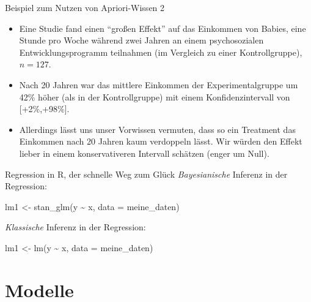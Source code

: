 \documentclass[
  ngerman,
  ignorenonframetext,
]{beamer}
\newenvironment{Shaded}{\begin{snugshade}}{\end{snugshade}}
\newcommand{\AttributeTok}[1]{\textcolor[rgb]{0.77,0.63,0.00}{#1}}
\newcommand{\FunctionTok}[1]{\textcolor[rgb]{0.00,0.00,0.00}{#1}}
\newcommand{\NormalTok}[1]{#1}
\newcommand{\OtherTok}[1]{\textcolor[rgb]{0.56,0.35,0.01}{#1}}
\newcommand{\SpecialCharTok}[1]{\textcolor[rgb]{0.00,0.00,0.00}{#1}}
\begin{document}
\begin{frame}{Beispiel zum Nutzen von Apriori-Wissen 2}
\protect\hypertarget{beispiel-zum-nutzen-von-apriori-wissen-2}{}
\begin{itemize}
\item
  Eine Studie fand einen ``großen Effekt'' auf das Einkommen von Babies,
  eine Stunde pro Woche während zwei Jahren an einem psychosozialen
  Entwicklungsprogramm teilnahmen (im Vergleich zu einer
  Kontrollgruppe), \(n=127\).
\item
  Nach 20 Jahren war das mittlere Einkommen der Experimentalgruppe um
  42\% höher (als in der Kontrollgruppe) mit einem Konfidenzintervall
  von {[}+2\%,+98\%{]}.
\item
  Allerdings lässt uns unser Vorwissen vermuten, dass so ein Treatment
  das Einkommen nach 20 Jahren kaum verdoppeln lässt. Wir würden den
  Effekt lieber in einem konservativeren Intervall schätzen (enger um
  Null).
\end{itemize}
\end{frame}

\begin{frame}[fragile]{Regression in R, der schnelle Weg zum Glück}
\protect\hypertarget{regression-in-r-der-schnelle-weg-zum-gluxfcck}{}
\emph{Bayesianische} Inferenz in der Regression:

\begin{Shaded}
\begin{Highlighting}[]
\NormalTok{lm1 }\OtherTok{\textless{}{-}} \FunctionTok{stan\_glm}\NormalTok{(y }\SpecialCharTok{\textasciitilde{}}\NormalTok{ x, }\AttributeTok{data =}\NormalTok{ meine\_daten)}
\end{Highlighting}
\end{Shaded}

\emph{Klassische} Inferenz in der Regression:

\begin{Shaded}
\begin{Highlighting}[]
\NormalTok{lm1 }\OtherTok{\textless{}{-}} \FunctionTok{lm}\NormalTok{(y }\SpecialCharTok{\textasciitilde{}}\NormalTok{ x, }\AttributeTok{data =}\NormalTok{ meine\_daten)}
\end{Highlighting}
\end{Shaded}
\end{frame}

\hypertarget{modelle}{%
\section{Modelle}\label{modelle}}
\end{document}
